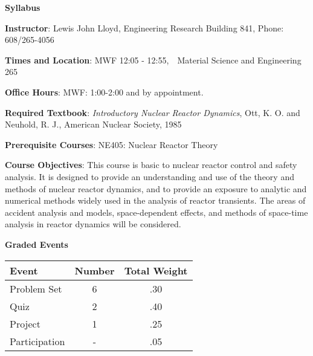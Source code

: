 
\renewcommand{\DocTitle}{Syllabus}
\noprintanswers


\begin{center}
\textbf{\DocTitle}
\end{center}

\textbf{Instructor}: 
Lewis John Lloyd,  Engineering Research Building 841, Phone: 608/265-4056

\textbf{Times and Location}:
MWF 12:05 - 12:55,\ \  Material Science and Engineering 265

\textbf{Office Hours}:
MWF: 1:00-2:00 and by appointment.

\textbf{Required Textbook}:
\textit{Introductory Nuclear Reactor Dynamics}, Ott, K. O. and Neuhold, R. J., American Nuclear Society, 1985

\textbf{Prerequisite Courses}: 
NE405: Nuclear Reactor Theory

\textbf{Course Objectives}: 
This course is basic to nuclear reactor control and safety analysis.
It is designed to provide an understanding and use of the theory and methods of nuclear reactor dynamics, and to provide an exposure to analytic and numerical methods widely used in the analysis of reactor transients.
The areas of accident analysis and models, space-dependent effects, and methods of space-time analysis in reactor dynamics will be considered.

\textbf{Graded Events}
{
\begin{center}
\setlength{\extrarowheight}{2.0pt}
\begin{tabular}{lcc}
Event 			& Number 	& Total Weight \\ \hline
Problem Set 	& 6 		& .30\\
Quiz 			& 2 		& .40\\
Project 		& 1 		& .25\\
Participation 	& - 		& .05\\
\end{tabular}
\end{center}
}


